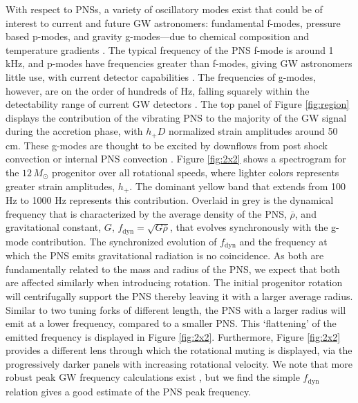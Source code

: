 \documentclass[twocolumn,times]{aastex62}  %
\begin{document}
With respect to PNSs, a variety of oscillatory modes exist that could be of interest to current and future GW astronomers: fundamental f-modes, pressure based p-modes, and gravity g-modes---due to chemical composition and temperature gradients \citep{unno:1989}.  The typical frequency of the PNS f-mode is around 1 kHz, and p-modes have frequencies greater than f-modes, giving GW astronomers little use, with current detector capabilities \citep{ho:2018}.  
The frequencies of g-modes, however, are on the order of hundreds of Hz, falling squarely within the detectability range of current GW detectors \citep{martynov:2016}.  
The top panel of Figure \ref{fig:region} displays the contribution of the vibrating PNS to the majority of the GW signal during the accretion phase, with $h_+D$ normalized strain amplitudes around 50 cm.  
These g-modes are thought to be excited by downflows from post shock convection or internal PNS convection \citep{murphy:2009,marek:2009b,muller:2013}.  
Figure \ref{fig:2x2} shows a spectrogram for the $12 \, M_\odot$ progenitor over all rotational speeds, where lighter colors represents greater strain amplitudes, $h_+$.  The dominant yellow band that extends from 100 Hz to 1000 Hz represents this contribution.  
Overlaid in grey is the dynamical frequency that is characterized by the average density of the PNS, $\overline{\rho}$, and gravitational constant, $G$, $f_\mathrm{dyn} = \sqrt{G \overline{\rho}}$,  that evolves synchronously with the g-mode contribution.  The synchronized evolution of $f_\mathrm{dyn}$ and the frequency at which the PNS emits gravitational radiation is no coincidence.  As both are fundamentally related to the mass and radius of the PNS, we expect that both are affected similarly when introducing rotation.  The initial progenitor rotation will centrifugally support the PNS thereby leaving it with a larger average radius.  Similar to two tuning forks of different length, the PNS with a larger radius will emit at a lower frequency, compared to a smaller PNS.  This `flattening' of the emitted frequency is displayed in Figure \ref{fig:2x2}.  Furthermore, Figure \ref{fig:2x2} provides a different lens through which the rotational muting is displayed, via the progressively darker panels with increasing rotational velocity.  We note that more robust peak GW frequency calculations exist \citep[e.g.,][]{muller:2013,moro:2018}, but we find the simple $f_\mathrm{dyn}$ relation gives a good estimate of the PNS peak frequency.
\end{document}
